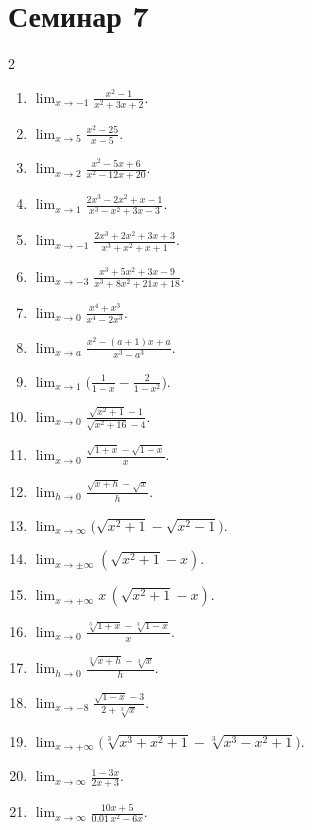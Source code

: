 \section{Семинар 7}
\begin{multicols}{2}
\begin{enumerate}
\item $\displaystyle \lim_{x\to -1} \frac{x^{2}-1}{x^{2}+3x+2}.$
\item $\displaystyle \lim_{x\to 5} \frac{x^{2}-25}{x-5}.$
\item $\displaystyle \lim_{x\to 2} \frac{x^{2}-5x+6}{x^{2}-12x+20}.$
\item $\displaystyle \lim_{x\to 1} \frac{2x^{3}-2x^{2}+x-1}{x^{3}-x^{2}+3x-3}.$
\item $\displaystyle \lim_{x\to -1} \frac{2x^{3}+2x^{2}+3x+3}{x^{3}+x^{2}+x+1}.$
\item $\displaystyle \lim_{x\to -3} \frac{x^{3}+5x^{2}+3x-9}{x^{3}+8x^{2}+21x+18}.$
\item $\displaystyle \lim_{x\to 0} \frac{x^{4}+x^{3}}{x^{4}-2x^{3}}.$
\item $\displaystyle \lim_{x\to a} \frac{x^{2}-(a+1)x+a}{x^{3}-a^{3}}.$
\item $\displaystyle \lim_{x\to 1} \Big(\frac{1}{1-x}-\frac{2}{1-x^{2}}\Big).$
\item $\displaystyle \lim_{x\to 0} \frac{\sqrt{x^{2}+1}-1}{\sqrt{x^{2}+16}-4}.$
\item $\displaystyle \lim_{x\to 0} \frac{\sqrt{1+x}-\sqrt{1-x}}{x}.$
\item $\displaystyle \lim_{h\to 0} \frac{\sqrt{x+h}-\sqrt{x}}{h}.$
\item $\displaystyle \lim_{x\to \infty} \big(\sqrt{x^{2}+1}-\sqrt{x^{2}-1}\big).$
\item $\displaystyle \lim_{x\to \pm\infty} (\sqrt{x^{2}+1}-x).$
\item $\displaystyle \lim_{x\to +\infty} x\, (\sqrt{x^{2}+1}-x).$
\item $\displaystyle \lim_{x\to 0} \frac{\sqrt[3]{1+x}-\sqrt[3]{1-x}}{x}.$
\item $\displaystyle \lim_{h\to 0} \frac{\sqrt[3]{x+h}-\sqrt[3]{x}}{h}.$
\item $\displaystyle \lim_{x\to -8} \frac{\sqrt{1-x}-3}{2+\sqrt[3]{x}}.$
\item $\displaystyle \lim_{x\to +\infty} \big(\sqrt[3]{x^{3}+x^{2}+1}-\sqrt[3]{x^{3}-x^{2}+1}\big).$
\item $\displaystyle \lim_{x\to \infty} \frac{1-3x}{2x+3}.$
\item $\displaystyle \lim_{x\to \infty} \frac{10x+5}{0.01\,x^{2}-6x}.$

\end{enumerate}
\end{multicols}
